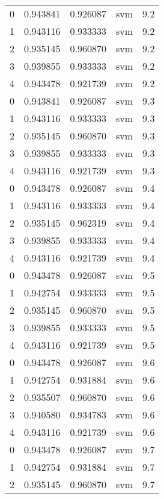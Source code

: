 \begin{tabular}{rrrlr}
     0 & 0.943841 & 0.926087 &      svm &        9.2 \\
     1 & 0.943116 & 0.933333 &      svm &        9.2 \\
     2 & 0.935145 & 0.960870 &      svm &        9.2 \\
     3 & 0.939855 & 0.933333 &      svm &        9.2 \\
     4 & 0.943478 & 0.921739 &      svm &        9.2 \\
     0 & 0.943841 & 0.926087 &      svm &        9.3 \\
     1 & 0.943116 & 0.933333 &      svm &        9.3 \\
     2 & 0.935145 & 0.960870 &      svm &        9.3 \\
     3 & 0.939855 & 0.933333 &      svm &        9.3 \\
     4 & 0.943116 & 0.921739 &      svm &        9.3 \\
     0 & 0.943478 & 0.926087 &      svm &        9.4 \\
     1 & 0.943116 & 0.933333 &      svm &        9.4 \\
     2 & 0.935145 & 0.962319 &      svm &        9.4 \\
     3 & 0.939855 & 0.933333 &      svm &        9.4 \\
     4 & 0.943116 & 0.921739 &      svm &        9.4 \\
     0 & 0.943478 & 0.926087 &      svm &        9.5 \\
     1 & 0.942754 & 0.933333 &      svm &        9.5 \\
     2 & 0.935145 & 0.960870 &      svm &        9.5 \\
     3 & 0.939855 & 0.933333 &      svm &        9.5 \\
     4 & 0.943116 & 0.921739 &      svm &        9.5 \\
     0 & 0.943478 & 0.926087 &      svm &        9.6 \\
     1 & 0.942754 & 0.931884 &      svm &        9.6 \\
     2 & 0.935507 & 0.960870 &      svm &        9.6 \\
     3 & 0.940580 & 0.934783 &      svm &        9.6 \\
     4 & 0.943116 & 0.921739 &      svm &        9.6 \\
     0 & 0.943478 & 0.926087 &      svm &        9.7 \\
     1 & 0.942754 & 0.931884 &      svm &        9.7 \\
     2 & 0.935145 & 0.960870 &      svm &        9.7 \\

\end{tabular}
